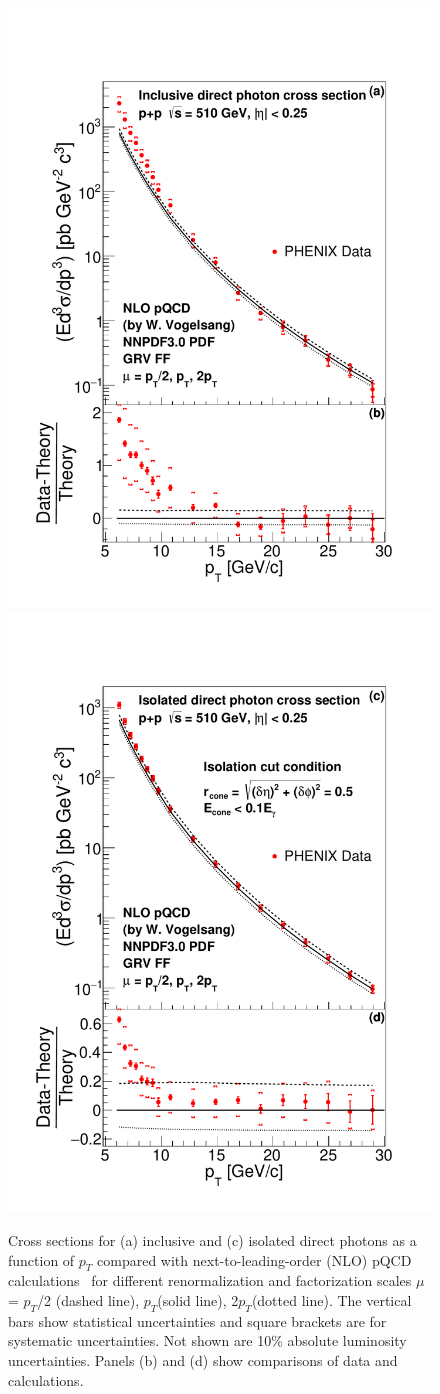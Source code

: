 \documentclass[twocolumn,letterpaper,aps,prl,longbibliography,superscriptaddress,floatfix]{revtex4-2}
\newcommand{\pT}{\mbox{$p_T$}\xspace}
\begin{document}
\begin{figure}[hbt!]
\includegraphics[width=0.48\linewidth]{CrossSection-photon-werner.pdf}
\includegraphics[width=0.48\linewidth]{CrossSection-isophoton-werner.pdf}
\caption{Cross sections for (a) inclusive and (c) isolated direct 
photons as a function of \pT compared with next-to-leading-order (NLO) 
pQCD calculations~\protect\cite{PhysRevD.48.3136,PhysRevD.50.1901} for different 
renormalization and factorization scales $\mu$ = \pT/2 (dashed line), 
\pT (solid line), 2\pT (dotted line). The vertical bars show statistical
uncertainties and square brackets are for systematic uncertainties.
Not shown are 10\% absolute luminosity uncertainties.
Panels (b) and (d) show comparisons of data and calculations.}
\label{fig:xsect}
\end{figure}
\end{document}
